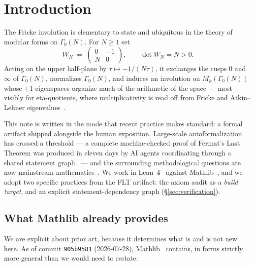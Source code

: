 \documentclass[11pt, a4paper]{article}
\theoremstyle{remark}
\begin{document}
\section{Introduction}

The Fricke involution is elementary to state and ubiquitous in the theory of modular forms
on $\Gamma_0(N)$. For $N \ge 1$ set
\[
  W_N \;=\; \begin{pmatrix} 0 & -1 \\ N & 0 \end{pmatrix}, \qquad \det W_N = N > 0 .
\]
Acting on the upper half-plane by $\tau \mapsto -1/(N\tau)$, it exchanges the cusps $0$ and
$\infty$ of $\Gamma_0(N)$, normalizes $\Gamma_0(N)$, and induces an involution on
$M_k(\Gamma_0(N))$ whose $\pm 1$ eigenspaces organize much of the arithmetic of the space
--- most visibly for eta-quotients, where multiplicativity is read off from Fricke and
Atkin--Lehner eigenvalues~\cite{Martin1996, Ono2004}.

This note is written in the mode that recent practice makes standard: a formal artifact
shipped alongside the human exposition. Large-scale autoformalization has crossed a
threshold --- a complete machine-checked proof of Fermat's Last Theorem was produced in
eleven days by AI agents coordinating through a shared statement graph~\cite{FLT2026,
Prove2Me2026} --- and the surrounding methodological questions are now mainstream
mathematics~\cite{Tao2026AI, Buzzard2021}. We work in Lean~4~\cite{deMoura2021} against
Mathlib~\cite{Mathlib2020}, and we adopt two specific practices from the FLT artifact:
the axiom audit as a \emph{build target}, and an explicit statement-dependency graph
(\S\ref{sec:verification}).

\subsection*{What Mathlib already provides}

We are explicit about prior art, because it determines what is and is not new here.
As of commit \texttt{905b9581} (2026-07-28), Mathlib~\cite{Mathlib2020} contains, in forms
strictly more general than we would need to restate:
\end{document}
